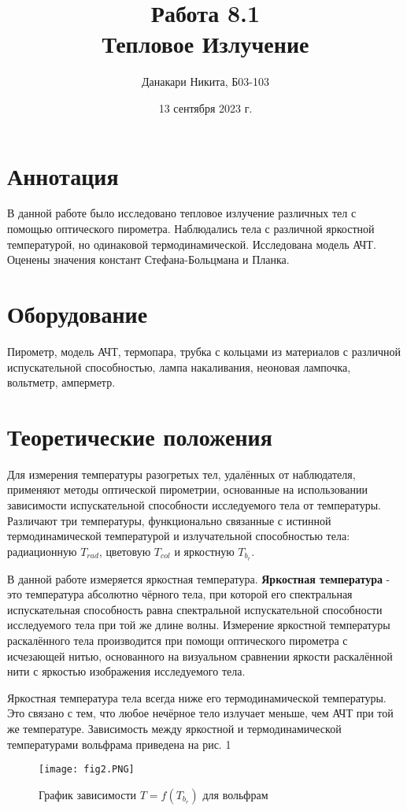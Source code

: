 \documentclass[a4paper]{article}
\author{Данакари Никита, Б03-103}
\date{13 сентября 2023 г.}
\title{\textbf{Работа 8.1\\
Тепловое Излучение}}
\begin{document}
\maketitle
\section{Аннотация}

\par В данной работе было исследовано тепловое излучение различных тел с помощью оптического пирометра. Наблюдались тела с различной яркостной температурой, но одинаковой термодинамической. Исследована модель АЧТ. Оценены значения констант Стефана-Больцмана и Планка.
\section{Оборудование}
Пирометр,  модель  АЧТ,  термопара,  трубка  с  кольцами  из 
материалов с различной испускательной  способностью, лампа накаливания, неоновая 
лампочка, вольтметр, амперметр.

\section{Теоретические положения}
Для измерения температуры разогретых тел, удалённых от наблюдателя, применяют методы оптической пирометрии, основанные на использовании зависимости испускательной способности исследуемого тела от температуры. Различают три температуры, функционально связанные с истинной термодинамической температурой и излучательной способностью тела: радиационную $T_{rad}$, цветовую $T_{col}$ и яркостную $T_b_r$. \par
В данной работе измеряется яркостная температура. \textbf{Яркостная температура} - это температура абсолютно чёрного тела, при которой его спектральная испускательная способность равна спектральной испускательной способности исследуемого тела при той же длине волны.
 Измерение яркостной температуры раскалённого тела производится при помощи оптического пирометра с исчезающей нитью, основанного на визуальном сравнении яркости раскалённой нити с яркостью изображения исследуемого тела. \par
Яркостная температура тела всегда ниже его термодинамической температуры. Это связано с тем, что любое нечёрное тело излучает меньше, чем АЧТ при той же температуре. Зависимость между яркостной и термодинамической температурами вольфрама приведена на рис. 1

\begin{figure}[h]
    \centering
    \texttt{[image: fig2.PNG]}
    \caption{График зависимости $T = f(T_b_r)$ для вольфрам}
    \label{fig:vac}
\end{figure}
\end{document}
